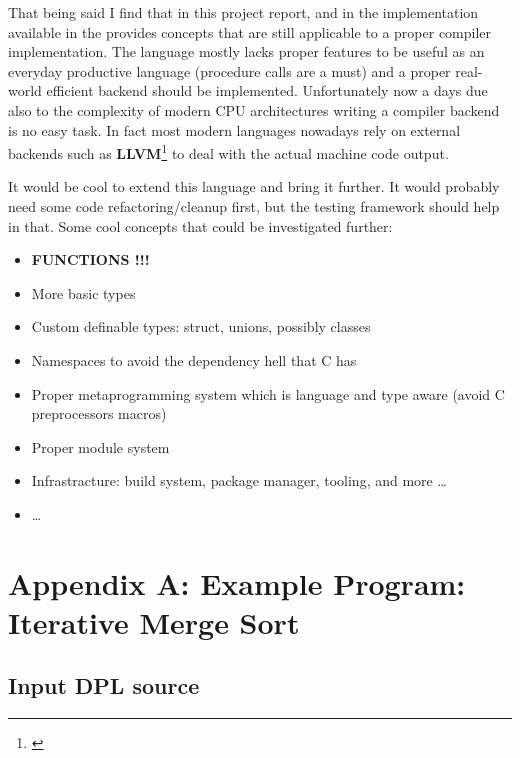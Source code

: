 \documentclass[a4paper]{article}
\newcommand{\urlref}[3][blue]{\href{#2}{\color{#1}{#3}}}%
\begin{document}
That being said I find that in this project report, and in the implementation available in the \urlref{https://github.com/dparo/dpcc}{Github Repo}
provides concepts that are still applicable to a proper compiler implementation.
The language mostly lacks proper features to be useful as an everyday productive language (procedure calls are a must)
and a proper real-world efficient backend should be implemented. Unfortunately now a days due also to the complexity
of modern CPU architectures writing a compiler backend is no easy task. In fact most modern languages
nowadays rely on external backends such as \textbf{LLVM}\footnote{\urlref{https://llvm.org/}{LLVM Website}} to deal with the actual machine code output.

It would be cool to extend this language and bring it further. It would probably need some code refactoring/cleanup first,
but the testing framework should help in that. Some cool concepts that could be investigated further:

\begin{itemize}
\item \textbf{FUNCTIONS !!!}
\item More basic types
\item Custom definable types: struct, unions, possibly classes
\item Namespaces to avoid the dependency hell that C has
\item Proper metaprogramming system which is language and type aware (avoid C preprocessors macros)
\item Proper module system
\item Infrastracture: build system, package manager, tooling, and more \dots
\item \dots
\end{itemize}

\clearpage
\section{Appendix A: Example Program: Iterative Merge Sort}
\label{appendix_a}

\subsection{Input DPL source}
\end{document}
